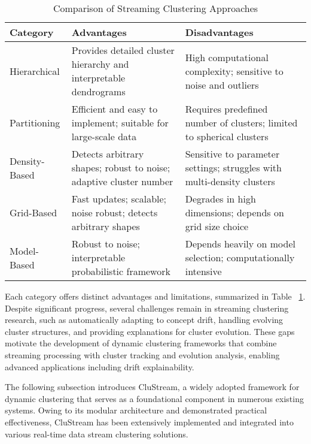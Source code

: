 \begin{table}[H]
    \centering

    \begin{tabular}{|l|p{6cm}|p{6cm}|}
        \hline
        \textbf{Category} & \textbf{Advantages}                                                & \textbf{Disadvantages}                                                 \\
        \hline
        Hierarchical      & Provides detailed cluster hierarchy and interpretable dendrograms  & High computational complexity; sensitive to noise and outliers         \\
        Partitioning      & Efficient and easy to implement; suitable for large-scale data     & Requires predefined number of clusters; limited to spherical clusters  \\
        Density-Based     & Detects arbitrary shapes; robust to noise; adaptive cluster number & Sensitive to parameter settings; struggles with multi-density clusters \\
        Grid-Based        & Fast updates; scalable; noise robust; detects arbitrary shapes     & Degrades in high dimensions; depends on grid size choice               \\
        Model-Based       & Robust to noise; interpretable probabilistic framework             & Depends heavily on model selection; computationally intensive          \\
        \hline
    \end{tabular}
    \caption{Comparison of Streaming Clustering Approaches}
    \label{table:streaming-clustering-comparison}
\end{table}

Each category offers distinct advantages and limitations, summarized in Table
~\ref{table:streaming-clustering-comparison}. Despite significant progress,
several challenges remain in streaming clustering research, such as
automatically adapting to concept drift, handling evolving cluster structures,
and providing explanations for cluster evolution. These gaps motivate the
development of dynamic clustering frameworks that combine streaming processing
with cluster tracking and evolution analysis, enabling advanced applications
including drift explainability.

The following subsection introduces CluStream, a widely adopted framework for
dynamic clustering that serves as a foundational component in numerous existing
systems. Owing to its modular architecture and demonstrated practical
effectiveness, CluStream has been extensively implemented and integrated into
various real-time data stream clustering solutions.

